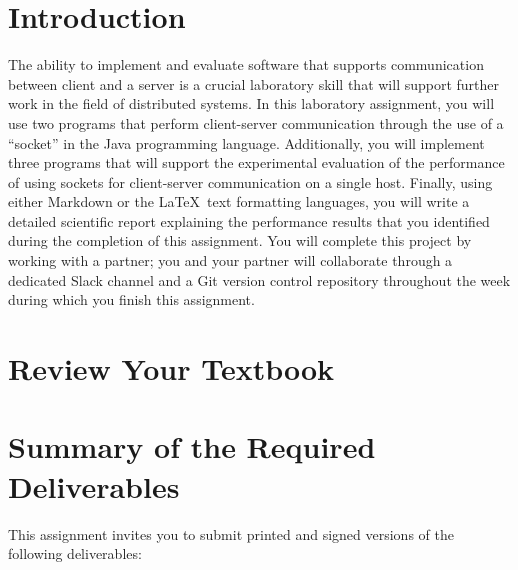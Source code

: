 


\usepackage[compact]{titlesec}



\section*{Introduction}

The ability to implement and evaluate software that supports communication between client and a server is a crucial
laboratory skill that will support further work in the field of distributed systems. In this laboratory assignment, you
will use two programs that perform client-server communication through the use of a ``socket'' in the Java programming
language. Additionally, you will implement three programs that will support the experimental evaluation of the
performance of using sockets for client-server communication on a single host. Finally, using either Markdown or the
\LaTeX~text formatting languages, you will write a detailed scientific report explaining the performance results that
you identified during the completion of this assignment. You will complete this project by working with a partner; you
and your partner will collaborate through a dedicated Slack channel and a Git version control repository throughout the
week during which you finish this assignment.

\section*{Review Your Textbook}






\section*{Summary of the Required Deliverables}

This assignment invites you to submit printed and signed versions of the following deliverables:

